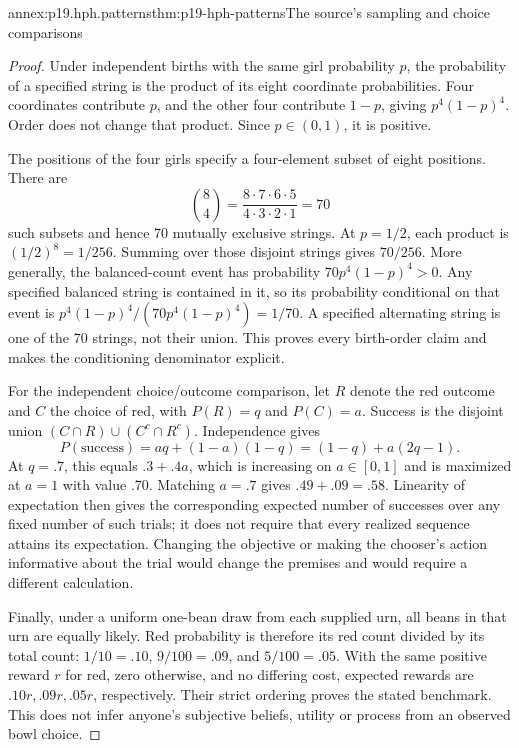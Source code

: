 \begin{annexitem}{annex:p19.hph.patterns}{thm:p19-hph-patterns}{The source's sampling and choice comparisons}
\begin{proof}
Under independent births with the same girl probability \(p\), the
probability of a specified string is the product of its eight coordinate
probabilities. Four coordinates contribute \(p\), and the other four
contribute \(1-p\), giving \(p^4(1-p)^4\). Order does not change
that product. Since \(p\in(0,1)\), it is positive.

The positions of the four girls specify a four-element subset of eight
positions. There are
\[
 \binom84=\frac{8\cdot7\cdot6\cdot5}{4\cdot3\cdot2\cdot1}=70
\]
such subsets and hence 70 mutually exclusive strings. At \(p=1/2\),
each product is \((1/2)^8=1/256\). Summing over those disjoint
strings gives \(70/256\). More generally, the balanced-count event
has probability \(70p^4(1-p)^4>0\). Any specified balanced string
is contained in it, so its probability conditional on that event is
\(p^4(1-p)^4/(70p^4(1-p)^4)=1/70\). A specified alternating string
is one of the 70 strings, not their union. This proves every birth-order
claim and makes the conditioning denominator explicit.

For the independent choice/outcome comparison, let \(R\) denote the
red outcome and \(C\) the choice of red, with \(P(R)=q\) and
\(P(C)=a\). Success is the disjoint union
\((C\cap R)\cup(C^c\cap R^c)\). Independence gives
\[
 P(\text{success})=aq+(1-a)(1-q)
                    =(1-q)+a(2q-1).
\]
At \(q=.7\), this equals \(.3+.4a\), which is increasing on
\(a\in[0,1]\) and is maximized at \(a=1\) with value .70.
Matching \(a=.7\) gives \(.49+.09=.58\). Linearity of expectation
then gives the corresponding expected number of successes over any
fixed number of such trials; it does not require that every realized
sequence attains its expectation. Changing the objective or making
the chooser's action informative about the trial would change the
premises and would require a different calculation.

Finally, under a uniform one-bean draw from each supplied urn, all beans
in that urn are equally likely. Red probability is therefore its red
count divided by its total count: \(1/10=.10\), \(9/100=.09\),
and \(5/100=.05\). With the same positive reward \(r\) for red,
zero otherwise, and no differing cost, expected rewards are
\(.10r,.09r,.05r\), respectively. Their strict ordering proves
the stated benchmark. This does not infer anyone's subjective beliefs,
utility or process from an observed bowl choice.
\end{proof}
\end{annexitem}

